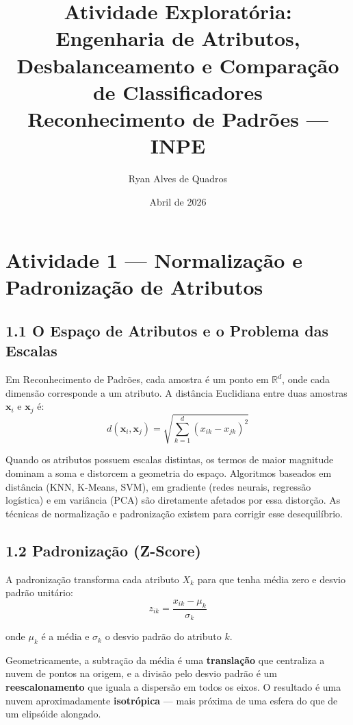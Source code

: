 \documentclass[12pt,a4paper]{article}
\title{Atividade Exploratória:\\Engenharia de Atributos, Desbalanceamento e Comparação de Classificadores\\[0.5em]
\large Reconhecimento de Padrões --- INPE}
\author{Ryan Alves de Quadros}
\date{Abril de 2026}
\begin{document}
\maketitle

\section*{Atividade 1 --- Normalização e Padronização de Atributos}

\subsection*{1.1 O Espaço de Atributos e o Problema das Escalas}

Em Reconhecimento de Padrões, cada amostra é um ponto em $\mathbb{R}^d$, onde cada dimensão corresponde a um atributo. A distância Euclidiana entre duas amostras $\mathbf{x}_i$ e $\mathbf{x}_j$ é:
%
\begin{equation}
    d(\mathbf{x}_i, \mathbf{x}_j) = \sqrt{\sum_{k=1}^{d}(x_{ik} - x_{jk})^2}
\end{equation}

Quando os atributos possuem escalas distintas, os termos de maior magnitude dominam a soma e distorcem a geometria do espaço. Algoritmos baseados em distância (KNN, K-Means, SVM), em gradiente (redes neurais, regressão logística) e em variância (PCA) são diretamente afetados por essa distorção. As técnicas de normalização e padronização existem para corrigir esse desequilíbrio.

\subsection*{1.2 Padronização (Z-Score)}

A padronização transforma cada atributo $X_k$ para que tenha média zero e desvio padrão unitário:
%
\begin{equation}
    z_{ik} = \frac{x_{ik} - \mu_k}{\sigma_k}
\end{equation}

\noindent onde $\mu_k$ é a média e $\sigma_k$ o desvio padrão do atributo $k$.

Geometricamente, a subtração da média é uma \textbf{translação} que centraliza a nuvem de pontos na origem, e a divisão pelo desvio padrão é um \textbf{reescalonamento} que iguala a dispersão em todos os eixos. O resultado é uma nuvem aproximadamente \textbf{isotrópica} --- mais próxima de uma esfera do que de um elipsóide alongado.
\end{document}
